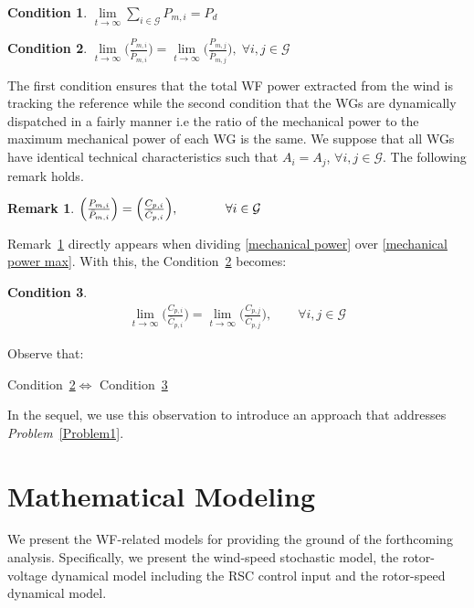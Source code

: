 \documentclass[letterpaper, 10 pt, conference]{ieeeconf}
\newtheorem{cond}{\textnormal{\textbf{Condition}}}
\newtheorem{remark}{\textnormal{\textbf{Remark}}}
\begin{document}
\begin{cond}
$\lim\limits_{t\to\infty} \sum\limits_{i\in\mathcal{G}} P_{m,i}= P_d$
\label{cond1}
\end{cond}
\begin{cond}
$\lim\limits_{t\to\infty}\Big(\frac{P_{m,i}}{\bar{P}_{m,i}}\Big)=\lim\limits_{t\to\infty}\Big(\frac{P_{m,j}}{\bar{P}_{m,j}}\Big),\;\forall i,j\in \mathcal{G}$
\label{cond2}
 \end{cond}
The first condition ensures that the total WF power extracted from the wind is tracking the reference while the second condition that the WGs are dynamically dispatched in a fairly manner i.e the ratio of the mechanical power to the maximum mechanical power of each WG is the same. We suppose that all WGs have identical technical characteristics such that $A_i=A_j$, $\forall i,j \in\mathcal{G}$. The following remark holds. \vspace{2mm} 
\begin{remark}
$\Big(\frac{P_{m,i}}{\bar{P}_{m,i}}\Big)=\Big(\frac{C_{p,i}}{\bar{C}_{p,i}}\Big),\hspace{13mm}    \forall i \in \mathcal{G}$
\label{remark1}
\end{remark}
Remark~\ref{remark1} directly appears when dividing \eqref{mechanical power} over \eqref{mechanical power max}. 
With this, the Condition~\ref{cond2} becomes:
\begin{cond}
\begin{align*}
\lim\limits_{t\to\infty}\Big(\frac{C_{p,i}}{\bar{C}_{p,i}}\Big)=\lim\limits_{t\to\infty}\Big(\frac{C_{p,j}}{\bar{C}_{p,j}}\Big),\qquad\forall i,j \in \mathcal{G}
\end{align*}
\label{cond3}
\end{cond}
Observe that:
\begin{center}
Condition~\ref{cond2}$\Leftrightarrow$ Condition~\ref{cond3}
\end{center} 
In the sequel, we use this observation to introduce an approach that addresses \textit{Problem}~\ref{Problem1}.









\section{Mathematical Modeling}
We present the WF-related models for providing the ground of the forthcoming analysis.  Specifically, we present the wind-speed stochastic model, the rotor-voltage dynamical model including the RSC control input and the rotor-speed dynamical model.
\end{document}
